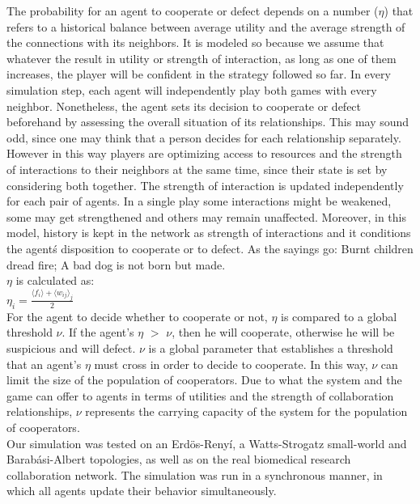 \documentclass{bmcart}
\begin{document}
The probability for an agent to cooperate or defect depends on a
number ($\eta$) that refers to a historical balance between average
utility and the average strength of the connections with its
neighbors. It is modeled so because we assume that whatever the result
in utility or strength of interaction, as long as one of them
increases, the player will be confident in the strategy followed so
far. In every simulation step, each agent will independently play both games with
every neighbor. Nonetheless, the agent sets its decision to cooperate or defect beforehand
by assessing the overall situation of its relationships. This may
sound odd, since one may think that a person decides for each
relationship separately. However in this way players are optimizing
access to resources and the strength of interactions to their
neighbors at the same time, since their state is set by
considering both together. The strength of interaction is updated independently for each pair of agents.  In a single play some interactions might be weakened, some may get strengthened and others may remain unaffected. Moreover, in this model, history is kept in the network as strength of interactions and it conditions the agent\'s disposition to cooperate or to defect. As the sayings go: Burnt children dread fire; A bad dog is not born but made.\\


$\eta$ is calculated as:\\ 


$\eta_i = \frac{\langle f_i \rangle + \langle w_{ij} \rangle _j}{2}$\\

For the agent to decide whether to cooperate or not, $\eta$ is
compared to a global threshold $\nu$. If the agent's $\eta$ $>$ $\nu$,
then he will cooperate, otherwise he will be suspicious and
will defect. $\nu$ is a global parameter that establishes a threshold
that an agent's $\eta$ must cross in order to decide to cooperate. In
this way, $\nu$ can limit the size of the population of
cooperators. Due to what the system and the game can offer to agents
in terms of utilities and the strength of collaboration relationships,
$\nu$ represents the carrying capacity of the
system for the population of cooperators.\\


Our simulation was tested on an Erd\"{o}s-Reny\'i, a
Watts-Strogatz small-world and Barab\'asi-Albert topologies, as well
as on the real biomedical research collaboration network. The
simulation was run in a synchronous manner, in which all agents update their
behavior simultaneously. \\   
\end{document}
